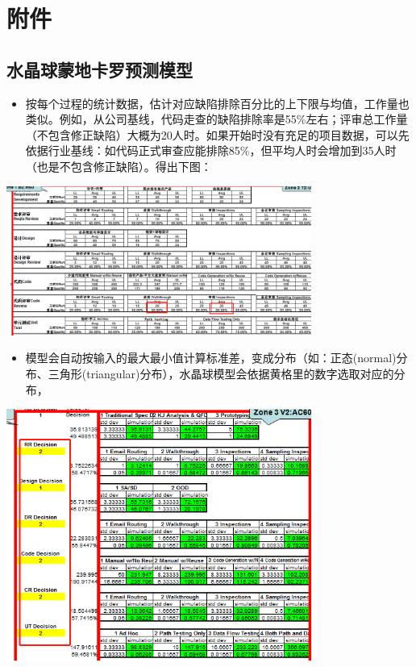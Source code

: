 \hypertarget{ux9644ux4ef6}{%
\section{附件}\label{ux9644ux4ef6}}

\hypertarget{ux6c34ux6676ux7403ux8499ux5730ux5361ux7f57ux9884ux6d4bux6a21ux578b}{%
\subsection{水晶球蒙地卡罗预测模型}\label{ux6c34ux6676ux7403ux8499ux5730ux5361ux7f57ux9884ux6d4bux6a21ux578b}}

\begin{itemize}
\tightlist
\item
  按每个过程的统计数据，估计对应缺陷排除百分比的上下限与均值，工作量也类似。例如，从公司基线，代码走查的缺陷排除率是55\%左右；评审总工作量（不包含修正缺陷）大概为20人时。如果开始时没有充足的项目数据，可以先依据行业基线：如代码正式审查应能排除85\%，但平均人时会增加到35人时
  （也是不包含修正缺陷）。得出下图：
\end{itemize}


\includegraphics[width=10cm]{微信截图_20211027011246.png}

\begin{itemize}
\tightlist
\item
  模型会自动按输入的最大最小值计算标准差，变成分布（如：正态(normal)分布、三角形(triangular)分布），水晶球模型会依据黄格里的数字选取对应的分布，
\end{itemize}


\includegraphics[width=10cm]{微信截图_20211027011403.png}

